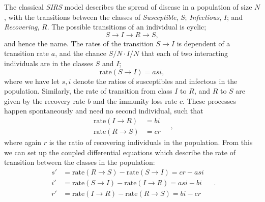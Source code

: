 \documentclass[]{article}
\begin{document}
The classical \textit{SIRS} model describes the spread of disease in a population of size $N$, with the transitions between the classes of \textit{Susceptible}, $S$; \textit{Infectious}, $I$; and \textit{Recovering}, $R$. The possible transitions of an individual is cyclic;
\begin{equation}
	S \rightarrow I \rightarrow R \rightarrow S,
\end{equation}
and hence the name. The rates of the transition $S \rightarrow I$ is dependent of a transition rate $a$, and the chance $S/N \cdot I/N$ that each of two interacting individuals are in the classes $S$ and $I$;
\begin{equation}
	\mathrm{rate}(S \rightarrow I) = asi,
\end{equation}
where we have let $s,i$ denote the ratios of susceptibles and infectous in the population. Similarly, the rate of transition from class $I$ to $R$, and $R$ to $S$ are given by the recovery rate $b$ and the immunity loss rate $c$. These processes happen spontaneously and need no second individual, such that
\begin{equation}
\begin{aligned}
	\mathrm{rate}(I \rightarrow R) &= bi \\
	\mathrm{rate}(R \rightarrow S) &= cr
\end{aligned} \quad,
\end{equation}
where again $r$ is the ratio of recovering individuals in the population. From this we can set up the coupled differential equations which describe the rate of transition between the classes in the population:
\begin{equation} \label{eq:sirs-classic}
\begin{aligned}
	s' &= \mathrm{rate}(R \rightarrow S) - \mathrm{rate}(S \rightarrow I) = cr - asi \\
	i' &= \mathrm{rate}(S \rightarrow I) - \mathrm{rate}(I \rightarrow R) = asi - bi \\
	r' &= \mathrm{rate}(I \rightarrow R) - \mathrm{rate}(R \rightarrow S) = bi - cr
\end{aligned} \quad .
\end{equation}
\end{document}

